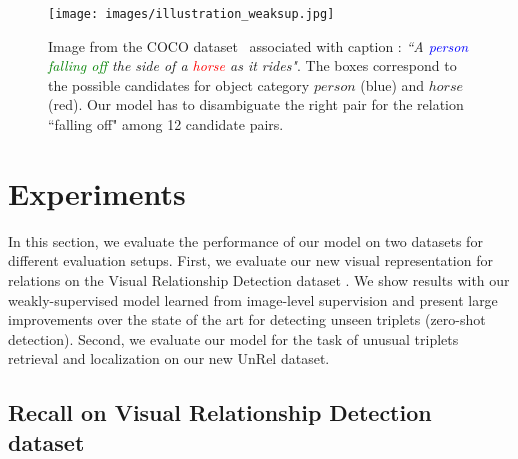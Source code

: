 \documentclass[10pt,twocolumn,letterpaper]{article}
\begin{document}
\begin{figure}[t]
	\begin{center}
   	\texttt{[image: images/illustration\_weaksup.jpg]}
	\end{center}
	\setlength\abovecaptionskip{-5pt}
   	\caption{Image from the COCO dataset~\cite{Lin2014a} associated with caption : \textit{``A \textcolor{blue}{person} \textcolor{Green}{falling off} the side of a \textcolor{red}{horse} as it rides"}. The boxes correspond to the possible candidates for object category $person$ (blue) and $horse$ (red). Our model has to disambiguate the right pair for the relation ``falling off" among 12 candidate pairs.}
   	\vspace{-.4cm}
\label{fig:coco_weak}
\end{figure}


\section{Experiments}


In this section, we evaluate the performance of our model on two
datasets for different evaluation setups. First, we evaluate our new
visual representation for relations on the Visual Relationship
Detection dataset \cite{Lu16}. We show results with our
weakly-supervised model learned from image-level supervision and
present large improvements over the state of the art for detecting
unseen triplets (zero-shot detection). Second, we evaluate our model for the task of unusual
triplets retrieval and localization on our new UnRel dataset. 




\subsection{Recall on Visual Relationship Detection dataset}
\end{document}
